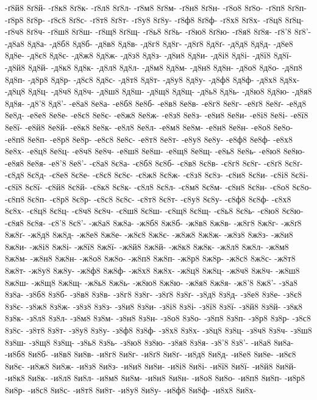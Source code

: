 {-ґ8й8
8ґ8й-
-ґ8к8
8ґ8к-
-ґ8л8
8ґ8л-
-ґ8м8
8ґ8м-
-ґ8н8
8ґ8н-
-ґ8о8
8ґ8о-
-ґ8п8
8ґ8п-
-ґ8р8
8ґ8р-
-ґ8с8
8ґ8с-
-ґ8т8
8ґ8т-
-ґ8у8
8ґ8у-
-ґ8ф8
8ґ8ф-
-ґ8х8
8ґ8х-
-ґ8ц8
8ґ8ц-
-ґ8ч8
8ґ8ч-
-ґ8ш8
8ґ8ш-
-ґ8щ8
8ґ8щ-
-ґ8ь8
8ґ8ь-
-ґ8ю8
8ґ8ю-
-ґ8я8
8ґ8я-
-ґ8'8
8ґ8'-
-д8а8
8д8а-
-д8б8
8д8б-
-д8в8
8д8в-
-д8г8
8д8г-
-д8ґ8
8д8ґ-
-д8д8
8д8д-
-д8е8
8д8е-
-д8є8
8д8є-
-д8ж8
8д8ж-
-д8з8
8д8з-
-д8и8
8д8и-
-д8і8
8д8і-
-д8ї8
8д8ї-
-д8й8
8д8й-
-д8к8
8д8к-
-д8л8
8д8л-
-д8м8
8д8м-
-д8н8
8д8н-
-д8о8
8д8о-
-д8п8
8д8п-
-д8р8
8д8р-
-д8с8
8д8с-
-д8т8
8д8т-
-д8у8
8д8у-
-д8ф8
8д8ф-
-д8х8
8д8х-
-д8ц8
8д8ц-
-д8ч8
8д8ч-
-д8ш8
8д8ш-
-д8щ8
8д8щ-
-д8ь8
8д8ь-
-д8ю8
8д8ю-
-д8я8
8д8я-
-д8'8
8д8'-
-е8а8
8е8а-
-е8б8
8е8б-
-е8в8
8е8в-
-е8г8
8е8г-
-е8ґ8
8е8ґ-
-е8д8
8е8д-
-е8е8
8е8е-
-е8є8
8е8є-
-е8ж8
8е8ж-
-е8з8
8е8з-
-е8и8
8е8и-
-е8і8
8е8і-
-е8ї8
8е8ї-
-е8й8
8е8й-
-е8к8
8е8к-
-е8л8
8е8л-
-е8м8
8е8м-
-е8н8
8е8н-
-е8о8
8е8о-
-е8п8
8е8п-
-е8р8
8е8р-
-е8с8
8е8с-
-е8т8
8е8т-
-е8у8
8е8у-
-е8ф8
8е8ф-
-е8х8
8е8х-
-е8ц8
8е8ц-
-е8ч8
8е8ч-
-е8ш8
8е8ш-
-е8щ8
8е8щ-
-е8ь8
8е8ь-
-е8ю8
8е8ю-
-е8я8
8е8я-
-е8'8
8е8'-
-є8а8
8є8а-
-є8б8
8є8б-
-є8в8
8є8в-
-є8г8
8є8г-
-є8ґ8
8є8ґ-
-є8д8
8є8д-
-є8е8
8є8е-
-є8є8
8є8є-
-є8ж8
8є8ж-
-є8з8
8є8з-
-є8и8
8є8и-
-є8і8
8є8і-
-є8ї8
8є8ї-
-є8й8
8є8й-
-є8к8
8є8к-
-є8л8
8є8л-
-є8м8
8є8м-
-є8н8
8є8н-
-є8о8
8є8о-
-є8п8
8є8п-
-є8р8
8є8р-
-є8с8
8є8с-
-є8т8
8є8т-
-є8у8
8є8у-
-є8ф8
8є8ф-
-є8х8
8є8х-
-є8ц8
8є8ц-
-є8ч8
8є8ч-
-є8ш8
8є8ш-
-є8щ8
8є8щ-
-є8ь8
8є8ь-
-є8ю8
8є8ю-
-є8я8
8є8я-
-є8'8
8є8'-
-ж8а8
8ж8а-
-ж8б8
8ж8б-
-ж8в8
8ж8в-
-ж8г8
8ж8г-
-ж8ґ8
8ж8ґ-
-ж8д8
8ж8д-
-ж8е8
8ж8е-
-ж8є8
8ж8є-
-ж8ж8
8ж8ж-
-ж8з8
8ж8з-
-ж8и8
8ж8и-
-ж8і8
8ж8і-
-ж8ї8
8ж8ї-
-ж8й8
8ж8й-
-ж8к8
8ж8к-
-ж8л8
8ж8л-
-ж8м8
8ж8м-
-ж8н8
8ж8н-
-ж8о8
8ж8о-
-ж8п8
8ж8п-
-ж8р8
8ж8р-
-ж8с8
8ж8с-
-ж8т8
8ж8т-
-ж8у8
8ж8у-
-ж8ф8
8ж8ф-
-ж8х8
8ж8х-
-ж8ц8
8ж8ц-
-ж8ч8
8ж8ч-
-ж8ш8
8ж8ш-
-ж8щ8
8ж8щ-
-ж8ь8
8ж8ь-
-ж8ю8
8ж8ю-
-ж8я8
8ж8я-
-ж8'8
8ж8'-
-з8а8
8з8а-
-з8б8
8з8б-
-з8в8
8з8в-
-з8г8
8з8г-
-з8ґ8
8з8ґ-
-з8д8
8з8д-
-з8е8
8з8е-
-з8є8
8з8є-
-з8ж8
8з8ж-
-з8з8
8з8з-
-з8и8
8з8и-
-з8і8
8з8і-
-з8ї8
8з8ї-
-з8й8
8з8й-
-з8к8
8з8к-
-з8л8
8з8л-
-з8м8
8з8м-
-з8н8
8з8н-
-з8о8
8з8о-
-з8п8
8з8п-
-з8р8
8з8р-
-з8с8
8з8с-
-з8т8
8з8т-
-з8у8
8з8у-
-з8ф8
8з8ф-
-з8х8
8з8х-
-з8ц8
8з8ц-
-з8ч8
8з8ч-
-з8ш8
8з8ш-
-з8щ8
8з8щ-
-з8ь8
8з8ь-
-з8ю8
8з8ю-
-з8я8
8з8я-
-з8'8
8з8'-
-и8а8
8и8а-
-и8б8
8и8б-
-и8в8
8и8в-
-и8г8
8и8г-
-и8ґ8
8и8ґ-
-и8д8
8и8д-
-и8е8
8и8е-
-и8є8
8и8є-
-и8ж8
8и8ж-
-и8з8
8и8з-
-и8и8
8и8и-
-и8і8
8и8і-
-и8ї8
8и8ї-
-и8й8
8и8й-
-и8к8
8и8к-
-и8л8
8и8л-
-и8м8
8и8м-
-и8н8
8и8н-
-и8о8
8и8о-
-и8п8
8и8п-
-и8р8
8и8р-
-и8с8
8и8с-
-и8т8
8и8т-
-и8у8
8и8у-
-и8ф8
8и8ф-
-и8х8
8и8х-
}
